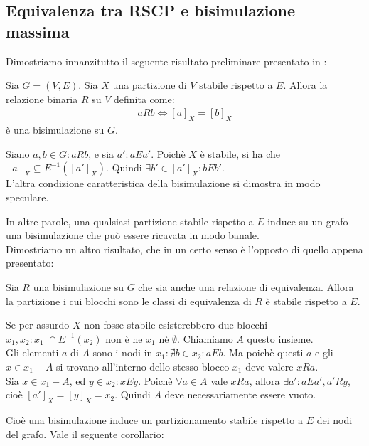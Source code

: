 \subsection{Equivalenza tra RSCP e bisimulazione massima}
Dimostriamo innanzitutto il seguente risultato preliminare presentato in \cite{gentilini}:
\begin{proposition}
    Sia $G = (V,E)$. Sia $X$ una partizione di $V$ stabile rispetto a $E$. Allora la relazione binaria $R$ su $V$ definita come:
    \begin{gather*}
        a R b \iff [a]_X = [b]_X
    \end{gather*}
    è una bisimulazione su $G$.
    \label{prop:part_induce_bisi}
\end{proposition}
\begin{proof2}
    Siano $a,b \in G : a R b$, e sia $a' : a E a'$. Poichè $X$ è stabile, si ha che $[a]_X \subseteq E^{-1}([a']_X)$. Quindi $\exists b' \in [a']_X : b E b'$.\\
    L'altra condizione caratteristica della bisimulazione si dimostra in modo speculare.
\end{proof2}
In altre parole, una qualsiasi partizione stabile rispetto a $E$ induce su un grafo una bisimulazione che può essere ricavata in modo banale.\\
Dimostriamo un altro risultato, che in un certo senso è l'opposto di quello appena presentato:
\begin{proposition}
    Sia $R$ una bisimulazione su $G$ che sia anche una relazione di equivalenza. Allora la partizione i cui blocchi sono le classi di equivalenza di $R$ è stabile rispetto a $E$.
    \label{prop:bisi_induce_part}
\end{proposition}
\begin{proof2}
    Se per assurdo $X$ non fosse stabile esisterebbero due blocchi $x_1, x_2 : x_1 \,\,\cap E^{-1}(x_2)$ non è ne $x_1$ nè $\emptyset$. Chiamiamo $A$ questo insieme.\\
    Gli elementi $a$ di $A$ sono i nodi in $x_1 : \nexists b \in x_2 : a E b$. Ma poichè questi $a$ e gli $x \in x_1 - A$ si trovano all'interno dello stesso blocco $x_1$ deve valere $x R a$.\\
    Sia $x \in x_1 - A$, ed $y \in x_2 : x E y$. Poichè $\forall a \in A$ vale $x R a$, allora $\exists a' : a E a', a' R y$, cioè $[a']_X = [y]_X = x_2$. Quindi $A$ deve necessariamente essere vuoto.
\end{proof2}
Cioè una bisimulazione induce un partizionamento stabile rispetto a $E$ dei nodi del grafo. Vale il seguente corollario:
